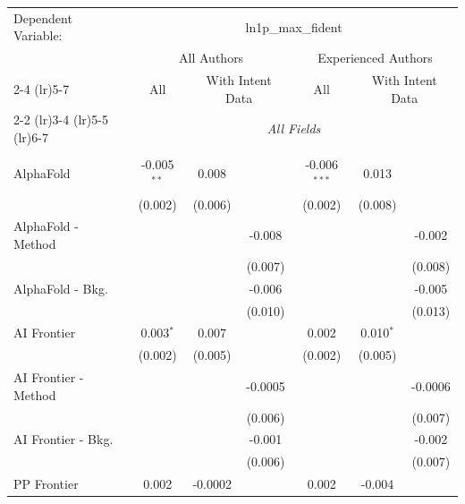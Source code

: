 \begingroup
\centering
\begin{tabular}{lcccccc}
   \tabularnewline \midrule \midrule
   Dependent Variable: & \multicolumn{6}{c}{ln1p\_max\_fident}\\
 & \multicolumn{3}{c}{All Authors} & \multicolumn{3}{c}{Experienced Authors} \\
\cmidrule(lr){2-4} \cmidrule(lr){5-7}
 & \multicolumn{1}{c}{All} & \multicolumn{2}{c}{With Intent Data} & \multicolumn{1}{c}{All} & \multicolumn{2}{c}{With Intent Data} \\
\cmidrule(lr){2-2} \cmidrule(lr){3-4} \cmidrule(lr){5-5} \cmidrule(lr){6-7}
 & \multicolumn{6}{c}{\textit{All Fields}} \\ \\
   AlphaFold            & -0.005$^{**}$ & 0.008   &         & -0.006$^{***}$ & 0.013       &   \\   
                        & (0.002)       & (0.006) &         & (0.002)        & (0.008)     &   \\   
   AlphaFold - Method   &               &         & -0.008  &                &             & -0.002\\   
                        &               &         & (0.007) &                &             & (0.008)\\   
   AlphaFold - Bkg.     &               &         & -0.006  &                &             & -0.005\\   
                        &               &         & (0.010) &                &             & (0.013)\\   
   AI Frontier          & 0.003$^{*}$   & 0.007   &         & 0.002          & 0.010$^{*}$ &   \\   
                        & (0.002)       & (0.005) &         & (0.002)        & (0.005)     &   \\   
   AI Frontier - Method &               &         & -0.0005 &                &             & -0.0006\\   
                        &               &         & (0.006) &                &             & (0.007)\\   
   AI Frontier - Bkg.   &               &         & -0.001  &                &             & -0.002\\   
                        &               &         & (0.006) &                &             & (0.007)\\   
   PP Frontier          & 0.002         & -0.0002 &         & 0.002          & -0.004      &   \\   

\end{tabular}
